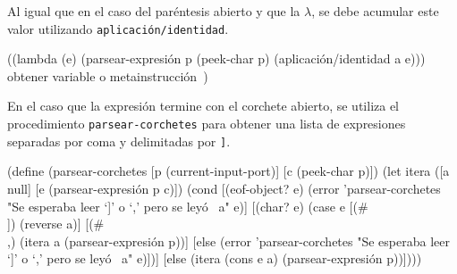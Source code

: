 \documentclass[letterpaper,twoside,openright,10pt]{book}
\begin{document}
Al igual que en el caso del paréntesis abierto y que la \( λ \), se debe acumular este valor utilizando {\tt{}\protect{}aplicación\protect{}/identidad}.

\nwenddocs{}\endmoddef
((lambda (e)
   (parsear-expresión p (peek-char p) (aplicación/identidad a e)))
 \LA{}obtener variable o metainstrucción~{\nwtagstyle{}}\RA{})
\nwendcode{}\nwdocspar

En el caso que la expresión termine con el corchete abierto, se utiliza el procedimiento {\tt{}\protect{}\protect{}parsear-corchetes} para obtener una lista de expresiones separadas por coma y delimitadas por {\tt{}{}{}]}.

\nwenddocs{}\plusendmoddef
(define (parsear-corchetes [p (current-input-port)]
                           [c (peek-char p)])
  (let itera ([a null]
              [e (parsear-expresión p c)])
       (cond [(eof-object? e)
              (error 'parsear-corchetes "Se esperaba leer `]' o `,' pero se leyó ~a" e)]
             [(char? e)
              (case e
                [(#\\]) (reverse a)]
                [(#\\,) (itera a (parsear-expresión p))]
                [else
                 (error 'parsear-corchetes "Se esperaba leer `]' o `,' pero se leyó ~a" e)])]
             [else
              (itera (cons e a) (parsear-expresión p))])))

\eatline
{}\nwendcode{}\nwdocspar
\end{document}
